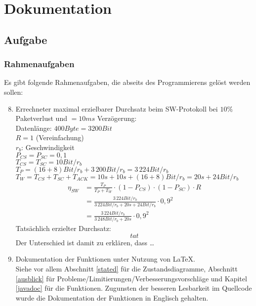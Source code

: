 \maketitle
\newpage
\tableofcontents
\newpage

\chapter{Dokumentation}

\section{Aufgabe}

\subsection{Rahmenaufgaben}

Es gibt folgende Rahmenaufgaben, die abseits des Programmierens gelöst werden sollen:
\begin{enumerate}
\setcounter{enumi}{7}
\item Errechneter maximal erzielbarer Durchsatz beim SW-Protokoll bei $10\%$ Paketverlust und $=10\unit{ms}$ Verzögerung:\\
Datenlänge: $400 \unit{Byte} = 3200\unit{Bit}$\\
$R=1$ (Vereinfachung)\\
$r_b$: Geschwindigkeit\\
$P_{CS}=P_{SC}=0,1$\\
$T_{CS}=T_{SC}=10\unit{Bit}/r_b$\\
$T_P=(16+8)\unit{Bit}/r_b+3\,200\unit{Bit}/r_b=3\,224\unit{Bit}/r_b$ \\
$T_W=T_{CS}+T_{SC}+T_{ACK}=10\unit{s}+10\unit{s}+(16+8)\unit{Bit}/r_b=20\unit{s}+24\unit{Bit}/r_b$
\begin{align*}
\eta_{SW}&=\frac{T_P}{T_P+ T_W}\cdot (1-P_{CS})\cdot(1-P_{SC}) \cdot R \\
&= \frac{3\,224\unit{Bit}/r_b}{3\,224\unit{Bit}/r_b+20\unit{s}+24\unit{Bit}/r_b}\cdot 0,9^2\\
&=\frac{3\,224\unit{Bit}/r_b}{3\,248\unit{Bit}/r_b+20\unit{s}}\cdot 0,9^2
\end{align*}
Tatsächlich erzielter Durchsatz:
$$tat$$
Der Unterschied ist damit zu erklären, dass …
\item Dokumentation der Funktionen unter Nutzung von \LaTeX{}.\\
Siehe vor allem Abschnitt \ref{stated} für die Zustandsdiagramme, Abschnitt \ref{ausblick} für Probleme/Limitierungen/Verbesserungsvorschläge  und Kapitel \ref{javadoc} für die Funktionen. Zugunsten der besseren Lesbarkeit im Quellcode wurde die Dokumentation der Funktionen in Englisch gehalten.
\end{enumerate}

